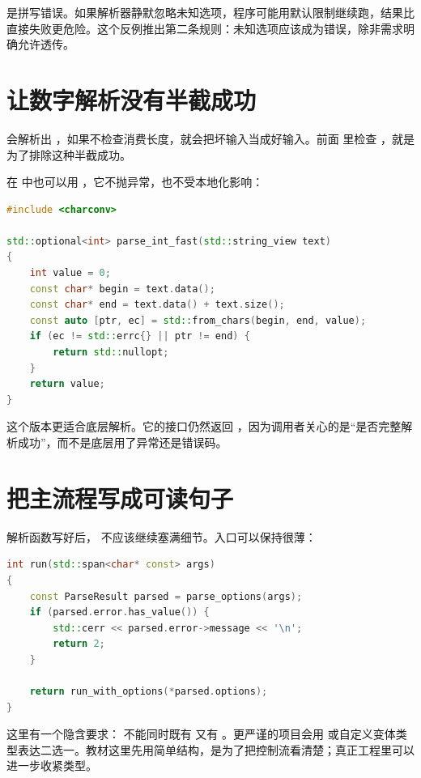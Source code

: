  是拼写错误。如果解析器静默忽略未知选项，程序可能用默认限制继续跑，结果比直接失败更危险。这个反例推出第二条规则：未知选项应该成为错误，除非需求明确允许透传。

\section{让数字解析没有半截成功}

 会解析出 ，如果不检查消费长度，就会把坏输入当成好输入。前面  里检查 ，就是为了排除这种半截成功。

在  中也可以用 ，它不抛异常，也不受本地化影响：

\begin{lstlisting}[language=C++,caption={用字符转换解析整数}]
#include <charconv>

std::optional<int> parse_int_fast(std::string_view text)
{
    int value = 0;
    const char* begin = text.data();
    const char* end = text.data() + text.size();
    const auto [ptr, ec] = std::from_chars(begin, end, value);
    if (ec != std::errc{} || ptr != end) {
        return std::nullopt;
    }
    return value;
}
\end{lstlisting}

这个版本更适合底层解析。它的接口仍然返回 ，因为调用者关心的是“是否完整解析成功”，而不是底层用了异常还是错误码。

\section{把主流程写成可读句子}

解析函数写好后， 不应该继续塞满细节。入口可以保持很薄：

\begin{lstlisting}[language=C++,caption={入口只负责连接步骤}]
int run(std::span<char* const> args)
{
    const ParseResult parsed = parse_options(args);
    if (parsed.error.has_value()) {
        std::cerr << parsed.error->message << '\n';
        return 2;
    }

    return run_with_options(*parsed.options);
}
\end{lstlisting}

这里有一个隐含要求： 不能同时既有  又有 。更严谨的项目会用  或自定义变体类型表达二选一。教材这里先用简单结构，是为了把控制流看清楚；真正工程里可以进一步收紧类型。

